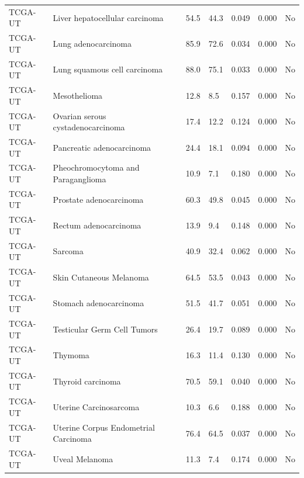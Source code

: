 \begin{longtable}{lllllll}
TCGA-UT & Liver hepatocellular carcinoma & 54.5 & 44.3 & 0.049 & 0.000 & No \\
TCGA-UT & Lung adenocarcinoma & 85.9 & 72.6 & 0.034 & 0.000 & No \\
TCGA-UT & Lung squamous cell carcinoma & 88.0 & 75.1 & 0.033 & 0.000 & No \\
TCGA-UT & Mesothelioma & 12.8 & 8.5 & 0.157 & 0.000 & No \\
TCGA-UT & Ovarian serous cystadenocarcinoma & 17.4 & 12.2 & 0.124 & 0.000 & No \\
TCGA-UT & Pancreatic adenocarcinoma & 24.4 & 18.1 & 0.094 & 0.000 & No \\
TCGA-UT & Pheochromocytoma and Paraganglioma & 10.9 & 7.1 & 0.180 & 0.000 & No \\
TCGA-UT & Prostate adenocarcinoma & 60.3 & 49.8 & 0.045 & 0.000 & No \\
TCGA-UT & Rectum adenocarcinoma & 13.9 & 9.4 & 0.148 & 0.000 & No \\
TCGA-UT & Sarcoma & 40.9 & 32.4 & 0.062 & 0.000 & No \\
TCGA-UT & Skin Cutaneous Melanoma & 64.5 & 53.5 & 0.043 & 0.000 & No \\
TCGA-UT & Stomach adenocarcinoma & 51.5 & 41.7 & 0.051 & 0.000 & No \\
TCGA-UT & Testicular Germ Cell Tumors & 26.4 & 19.7 & 0.089 & 0.000 & No \\
TCGA-UT & Thymoma & 16.3 & 11.4 & 0.130 & 0.000 & No \\
TCGA-UT & Thyroid carcinoma & 70.5 & 59.1 & 0.040 & 0.000 & No \\
TCGA-UT & Uterine Carcinosarcoma & 10.3 & 6.6 & 0.188 & 0.000 & No \\
TCGA-UT & Uterine Corpus Endometrial Carcinoma & 76.4 & 64.5 & 0.037 & 0.000 & No \\
TCGA-UT & Uveal Melanoma & 11.3 & 7.4 & 0.174 & 0.000 & No \\
\end{longtable}

